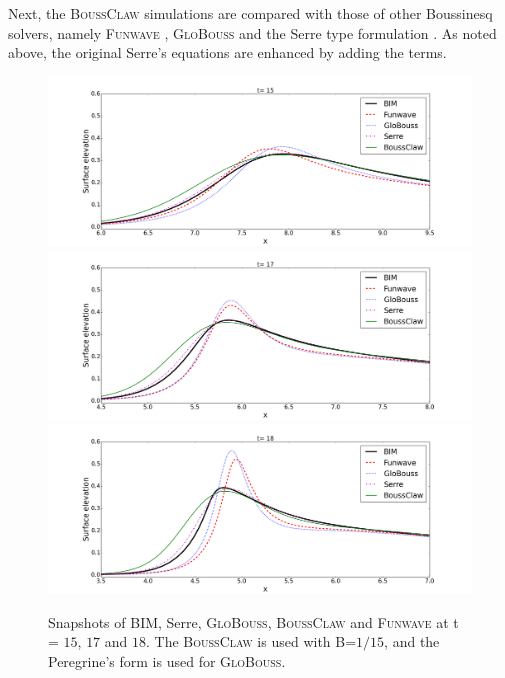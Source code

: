\documentclass[review]{elsarticle}
\begin{document}
Next, the \textsc{BoussClaw} simulations are compared
with those of other Boussinesq solvers, namely
 \textsc{Funwave} \citep{shi2012high}, \textsc{GloBouss} \citep{lovholt2010coupling} and the Serre type formulation \citep{Lovholt:2013a}.
As noted above, 
the original Serre's equations are enhanced by adding the \citet{schaffer1993boussinesq} terms. 

\begin{figure}[!htb]
\centering
\includegraphics[width=.9\textwidth]{_fig/bim_boussclaw_fun_glob_150.png}\\
\includegraphics[width=.9\textwidth]{_fig/bim_boussclaw_fun_glob_170.png}\\
\includegraphics[width=.9\textwidth]{_fig/bim_boussclaw_fun_glob_180.png}
\caption{Snapshots of BIM, Serre, \textsc{GloBouss}, \textsc{BoussClaw}
and \textsc{Funwave} at t = $15$, $17$ and $18$.
The \textsc{BoussClaw} is used with B=$1/15$,
and the Peregrine's form is used for \textsc{GloBouss}.}
\label{fig:bim_boussclaw_fun}
\end{figure}
\end{document}
